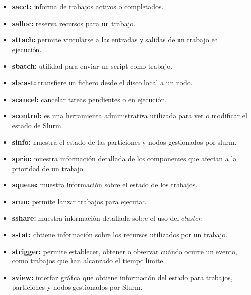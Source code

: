 \begin{itemize}
    \item \textbf{sacct: } informa de trabajos activos o completados.
    
    \item \textbf{salloc: } reserva recursos para un trabajo.
    
    \item \textbf{sttach: } permite vincularse a las entradas y salidas de un trabajo en ejecución.
    
    \item \textbf{sbatch: } utilidad para enviar un script como trabajo.
    
    \item \textbf{sbcast: } transfiere un fichero desde el disco local a un nodo.
    
    \item \textbf{scancel: } cancelar tareas pendientes o en ejecución. 

    \item \textbf{scontrol: } es una herramienta administrativa utilizada para ver o modificar el estado de Slurm.
    
    \item \textbf{sinfo: } muestra el estado de las particiones y nodos gestionados por slurm.

    \item \textbf{sprio: } muestra información detallada de los componentes que afectan a la prioridad de un trabajo.

    \item \textbf{squeue: } muestra información sobre el estado de los trabajos.

    \item \textbf{srun: } permite lanzar trabajos para ejecutar.

    \item \textbf{sshare: } muestra información detallada sobre el uso del \emph{cluster}.

    \item \textbf{sstat: } obtiene información sobre los recursos utilizados por un trabajo.

    \item \textbf{strigger: } permite establecer, obtener o observar cuándo ocurre un evento, como trabajos que han alcanzado el tiempo límite.
    
    \item \textbf{sview: } interfaz gráfica que obtiene información del estado para trabajos, particiones y nodos gestionados por Slurm. \newline
\end{itemize}

